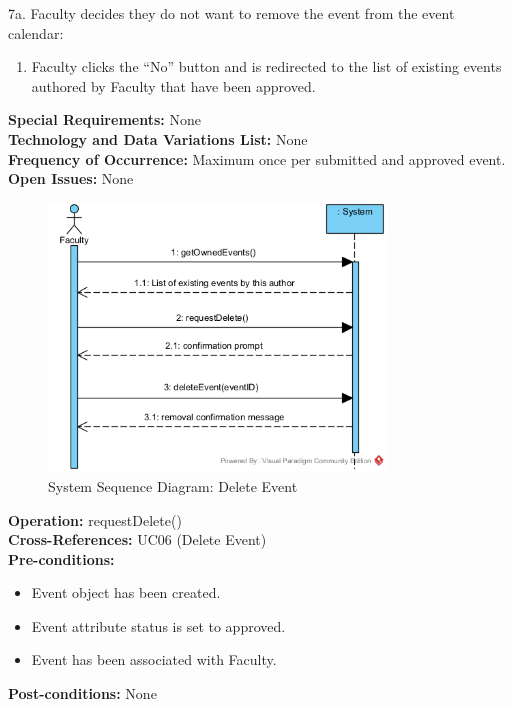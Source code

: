 7a. Faculty decides they do not want to remove the event from the event calendar:
\begin{enumerate}
    \item Faculty clicks the ``No'' button and is redirected to the list of existing events authored by Faculty that have been approved.
\end{enumerate}
\textbf{Special Requirements:} None \\
\textbf{Technology and Data Variations List:} None \\
\textbf{Frequency of Occurrence:} Maximum once per submitted and approved event. \\
\textbf{Open Issues:} None \\

\begin{figure}[H]
    \centering
    \includegraphics[width=0.8\textwidth]{images/SSD-UC06-DeleteEvent.png}
    \centering
    \caption{System Sequence Diagram: Delete Event}
\end{figure}

\textbf{Operation:} requestDelete() \\
\textbf{Cross-References:} UC06 (Delete Event) \\
\textbf{Pre-conditions:}
\begin{itemize}
    \item Event object has been created.
    \item Event attribute status is set to approved.
    \item Event has been associated with Faculty.
\end{itemize}
\textbf{Post-conditions:} None \\

